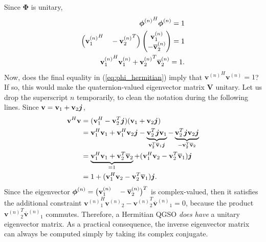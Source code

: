 Since $\mathbf{\Phi}$ is unitary,
\begin{equation}
    \label{eq:phi_hermitian}
    \begin{aligned}
        {\mathbf{\boldsymbol{\phi}}^{(n)}}^H \mathbf{\boldsymbol{\phi}}^{(n)} = 1 \\
        \Big({\mathbf{v}^{(n)}_1}^H \quad - {\mathbf{v}^{(n)}_2}^T \Big)
        \begin{pmatrix}
            \mathbf{v}^{(n)}_1 \\
            - \overline{\mathbf{v}}^{(n)}_2
        \end{pmatrix} = 1       \\
        {\mathbf{v}^{(n)}_1}^H \mathbf{v}^{(n)}_1 + {\mathbf{v}^{(n)}_2}^T \overline{\mathbf{v}}^{(n)}_2 = 1.
    \end{aligned}
\end{equation}
Now, does the final equality in (\ref{eq:phi_hermitian}) imply that ${\mathbf{v}^{(n)}}^H \mathbf{v}^{(n)} = 1$? If so, this would make the quaternion-valued eigenvector matrix $\mathbf{V}$ unitary. Let us drop the superscript $n$ temporarily, to clean the notation during the following lines. Since $\mathbf{v} = \mathbf{v}_1 + \mathbf{v}_2 \boldsymbol{j}$,
\begin{equation}
    \begin{aligned}
        \mathbf{v}^H \mathbf{v} & = (\mathbf{v}^H_1 - \mathbf{v}^T_2 \boldsymbol{j}) (\mathbf{v}_1 + \mathbf{v}_2 \boldsymbol{j})                                                                                       \\
                                & = \mathbf{v}^H_1 \mathbf{v}_1 + \mathbf{v}^H_1 \mathbf{v}_2 \boldsymbol{j}
        - \underbrace{\mathbf{v}^T_2 \boldsymbol{j} \mathbf{v}_1}_{\mathbf{v}^T_2 \overline{\mathbf{v}}_1 \boldsymbol{j}} - \underbrace{\mathbf{v}_2^T \boldsymbol{j} \mathbf{v}_2 \boldsymbol{j}}_{- \mathbf{v}_2^T \overline{\mathbf{v}}_2} \\
                                & = \underbrace{\mathbf{v}_1^H \mathbf{v}_1 + \mathbf{v}_2^T \overline{\mathbf{v}}_2}_{= 1} +
        (\mathbf{v}^H_1 \mathbf{v}_2 - \mathbf{v}_2^T \overline{\mathbf{v}}_1) \boldsymbol{j}                                                                                                                \\
                                & = 1 + (\mathbf{v}^H_1 \mathbf{v}_2 - \mathbf{v}_2^T \overline{\mathbf{v}}_1) \boldsymbol{j}.
    \end{aligned}
\end{equation}
Since the eigenvector $\mathbf{\boldsymbol{\phi}}^{(n)} = \big( \mathbf{v}^{(n)}_1 \quad - \overline{\mathbf{v}}^{(n)}_2 \big)^T$ is complex-valued, then it satisfies the additional constraint ${\mathbf{v}^{(n)}}^H_1 {\mathbf{v}^{(n)}}_2 - {\mathbf{v}^{(n)}}_2^T {\overline{\mathbf{v}}^{(n)}}_1 = 0$, because the product ${\mathbf{v}^{(n)}}_2^T {\overline{\mathbf{v}}^{(n)}}_1$ commutes. Therefore, a Hermitian QGSO \textit{does have} a unitary eigenvector matrix. As a practical consequence, the inverse eigenvector matrix can always be computed simply by taking its complex conjugate.

